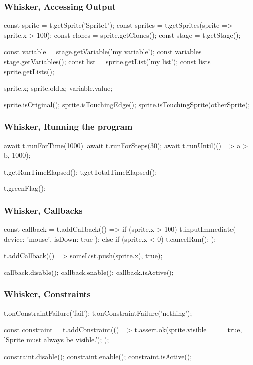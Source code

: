 \begin{frame}[fragile]\frametitle{Whisker, Accessing Output}
    \begin{javascriptcode}
        const sprite = t.getSprite('Sprite1');
        const sprites = t.getSprites(sprite => sprite.x > 100);
        const clones = sprite.getClones();
        const stage = t.getStage();

        const variable = stage.getVariable('my variable');
        const variables = stage.getVariables();
        const list = sprite.getList('my list');
        const lists = sprite.getLists();

        sprite.x;
        sprite.old.x;
        variable.value;

        sprite.isOriginal();
        sprite.isTouchingEdge();
        sprite.isTouchingSprite(otherSprite);
    \end{javascriptcode}
\end{frame}

\begin{frame}[fragile]\frametitle{Whisker, Running the program}
    \begin{javascriptcode}
        await t.runForTime(1000);
        await t.runForSteps(30);
        await t.runUntil(() => a > b, 1000);

        t.getRunTimeElapsed();
        t.getTotalTimeElapsed();

        t.greenFlag();
    \end{javascriptcode}
\end{frame}

\begin{frame}[fragile]\frametitle{Whisker, Callbacks}
    \begin{javascriptcode}
        const callback = t.addCallback(() => {
            if (sprite.x > 100) {
                t.inputImmediate({ device: 'mouse', isDown: true });
            } else if (sprite.x < 0) {
                t.cancelRun();
            }
        });

        t.addCallback(() => someList.push(sprite.x), true);

        callback.disable();
        callback.enable();
        callback.isActive();
    \end{javascriptcode}
\end{frame}

\begin{frame}[fragile]\frametitle{Whisker, Constraints}
    \begin{javascriptcode}
        t.onConstraintFailure('fail');
        t.onConstraintFailure('nothing');

        const constraint = t.addConstraint(() => {
            t.assert.ok(sprite.visible === true,
                'Sprite must always be visible.');
        });

        constraint.disable();
        constraint.enable();
        constraint.isActive();
    \end{javascriptcode}
\end{frame}

